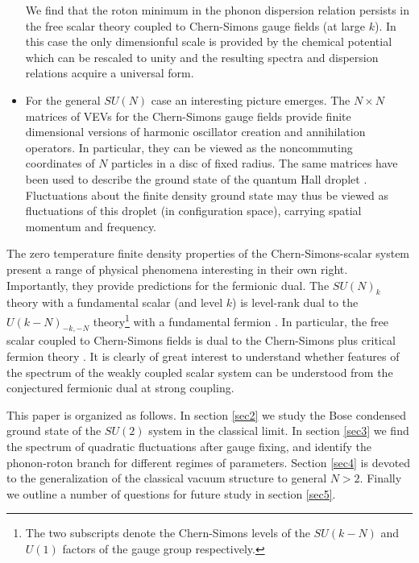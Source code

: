 \begin{itemize}
{ We find that the roton minimum in the phonon dispersion relation persists in the free scalar theory coupled to Chern-Simons gauge fields (at large $k$). In this case the only dimensionful scale is provided by the chemical potential which can be rescaled to unity and the resulting spectra and dispersion relations acquire a universal form.  }
 \item{For the general $SU(N)$ case an interesting picture emerges. The $N\times N$ matrices of VEVs for the Chern-Simons gauge fields provide  finite dimensional versions of harmonic oscillator  creation and annihilation operators. In particular, they can be viewed as the noncommuting coordinates of $N$ particles in a disc of fixed radius. The same matrices have been used to describe the ground state of the quantum Hall droplet \cite{Polychronakos:2001mi, Susskind:2001fb}. Fluctuations about the finite density ground state  may thus be viewed as fluctuations of this droplet (in configuration space), carrying spatial momentum and frequency.}
  \end{itemize}
 The zero temperature finite density properties of the Chern-Simons-scalar system present a range of physical phenomena interesting in their own right. Importantly, they provide predictions for the fermionic dual.  The $SU(N)_k$  theory with a fundamental scalar (and level $k$) is level-rank dual to the $U(k-N)_{-k, -N}$ theory\footnote{The two subscripts denote the Chern-Simons levels of the $SU(k-N)$ and $U(1)$ factors of the gauge group respectively.} with a fundamental fermion \cite{Aharony:2015mjs}. In particular, the free scalar coupled to Chern-Simons fields is dual to the Chern-Simons plus critical fermion theory \cite{Minwalla:2015sca}. It is clearly of great interest to understand whether features of the spectrum of the weakly coupled scalar system can be understood from the conjectured fermionic dual at strong coupling.
 
 This paper is organized as follows. In section \ref{sec2} we study the Bose condensed ground state of the $SU(2)$ system in the classical limit. In section \ref{sec3} we find the spectrum of quadratic fluctuations after gauge fixing, and identify the phonon-roton branch for different regimes of parameters. Section \ref{sec4} is devoted to the generalization of the classical vacuum structure to general $N>2$.  Finally we outline a number of questions for future study in section \ref{sec5}.
 
